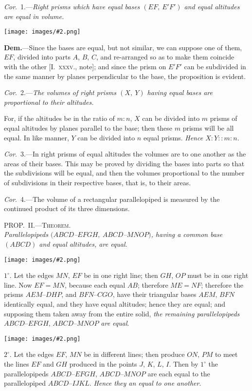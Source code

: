 \documentclass[oneside]{book}
\newcommand\myprop[2]{
\bigskip\Needspace*{4\baselineskip}\begin{center}\textsc{#1}\\\medskip\emph{#2}\par\end{center}
}
\newcommand\imgcent[2]{
\begin{center}
\texttt{[image: images/\#2.png]}
\end{center}
}
\begin{document}

\textit{Cor}.~1.---\textit{Right prisms which have equal bases $(EF,\ E'F')$
and equal altitudes are equal in volume.}

\imgcent{213}{f237}

\textbf{Dem.}---Since the bases are equal, but not similar, we
can suppose one of them, $EF$, divided into parts $A$, $B$, $C$,
and re-arranged so as to make them coincide with the
other [I.~\textsc{xxxv.}, note]; and since the prism on $E'F'$ can
be subdivided in the same manner by planes perpendicular
to the base, the proposition is evident.

\textit{Cor}.~2.---\textit{The volumes of right prisms $(X,\ Y)$ having
equal bases are proportional to their altitudes.}

For, if the altitudes be in the ratio of $m : n$, $X$ can
be divided into $m$ prisms of equal altitudes by planes
parallel to the base; then these $m$ prisms will be all
equal. In like manner, $Y$ can be divided into $n$ equal
prisms. \textit{Hence $X : Y :: m : n$.}

\textit{Cor}.~3.---In right prisms of equal altitudes the
volumes are to one another as the areas of their bases.
This may be proved by dividing the bases into parts
so that the subdivisions will be equal, and then the
volumes proportional to the number of subdivisions in
their respective bases, that is, to their areas.

\textit{Cor}.~4.---The volume of a rectangular parallelopiped
is measured by the continued product of its three dimensions.

\myprop{PROP\@.~II\@.---Theorem.}{Parallelopipeds $(ABCD$--$EFGH,\ ABCD$--$MNOP)$, having
a common base $(ABCD)$ and equal altitudes, are equal.}

\imgcent{250}{f238}

$1^\circ$. Let the edges $MN$, $EF$ be in one right line; then
$GH$, $OP$ must be in one right line. Now $EF = MN$,
because each equal $AB$; therefore $ME=NF$; therefore
the prisms $AEM$--$DHP$, and $BFN$--$CGO$, have their
triangular bases $AEM$, $BFN$ identically equal, and
they have equal altitudes; hence they are equal; and
supposing them taken away from the entire solid, \emph{the
remaining parallelopipeds} $ABCD$--$EFGH$, $ABCD$--$MNOP$
\emph{are equal}.

\imgcent{280}{f239}

$2^{\circ}$. Let the edges $EF$, $MN$ be in different lines;
then produce $ON$, $PM$ to meet the lines $EF$ and $GH$
produced in the points $J$, $K$, $L$, $I$. Then by $1^{\circ}$ the
parallelopipeds $ABCD$--$EFGH$, $ABCD$--$MNOP$ are each
equal to the parallelopiped $ABCD$--$IJKL$. \emph{Hence they
an equal to one another}.
\end{document}
